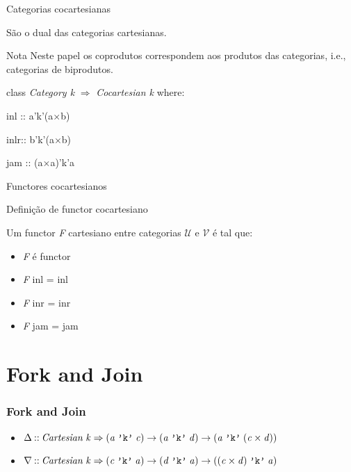 \documentclass{beamer}
\newcommand{\Conid}[1]{\mathit{#1}}
\newcommand{\Varid}[1]{\mathit{#1}}
\newenvironment{slide}[1]{\begin{frame}\frametitle{#1}}{\end{frame}}
\begin{document}
\begin{frame}{Categorias cocartesianas}

São o dual das categorias cartesianas.
\begin{block}{Nota}
Neste papel os coprodutos correspondem aos produtos das categorias, i.e., categorias de biprodutos.
\end{block}

\begin{block}

class \textit{Category k} $\Rightarrow$ \textit{Cocartesian k} where:

\hspace{0.2cm}inl :: a'k'(a$\times$b)

\hspace{0.2cm}inlr:: b'k'(a$\times$b)

\hspace{0.2cm}jam :: (a$\times$a)'k'a

\end{block}


\end{frame}


\begin{frame}{Functores cocartesianos}

\begin{block}{Definição de functor cocartesiano}


Um functor \textit{F} cartesiano entre categorias $\mathcal{U}$ e $\mathcal{V}$ é tal que:
\begin{itemize}
    \item \textit{F} é functor 
    \item \textit{F} inl = inl
    \item \textit{F} inr = inr
    \item \textit{F} jam = jam
\end{itemize}


\end{block}


\end{frame}

\section{Fork and Join}
\begin{slide}{Fork and Join}
    \begin{itemize}
        \item
            \ensuremath{ \Delta \mathbin{::}\Conid{Cartesian}\;\Varid{k}\Rightarrow(\Varid{a}\;\text{\tt 'k'}\;\Varid{c})\rightarrow (\Varid{a}\;\text{\tt 'k'}\;\Varid{d})\rightarrow (\Varid{a}\;\text{\tt 'k'}\;(\Varid{c} \times \Varid{d}))}
        \item
            \ensuremath{ \nabla \mathbin{::}\Conid{Cartesian}\;\Varid{k}\Rightarrow(\Varid{c}\;\text{\tt 'k'}\;\Varid{a})\rightarrow (\Varid{d}\;\text{\tt 'k'}\;\Varid{a})\rightarrow ((\Varid{c} \times \Varid{d})\;\text{\tt 'k'}\;\Varid{a})}
    \end{itemize}
\end{slide}
\end{document}
